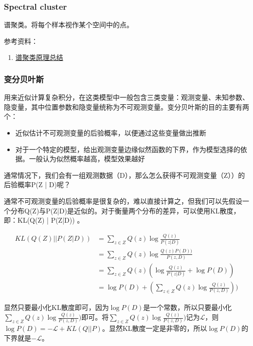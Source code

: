 \subsubsection{Spectral cluster}
谱聚类。将每个样本视作某个空间中的点。

参考资料：
\begin{enumerate}
	\item \href{https://www.cnblogs.com/pinard/p/6221564.htm}{谱聚类原理总结}
\end{enumerate}


\subsubsection{变分贝叶斯}
用来近似计算复杂积分，在这类模型中一般包含三类变量：观测变量、未知参数、隐变量，其中位置参数和隐变量统称为不可观测变量。变分贝叶斯的目的主要有两个：
\begin{itemize}
	\item 近似估计不可观测变量的后验概率，以便通过这些变量做出推断
	\item 对于一个特定的模型，给出观测变量边缘似然函数的下界，作为模型选择的依据。一般认为似然概率越高，模型效果越好
\end{itemize}
通常情况下，我们会有一组观测数据（D），那么怎么获得不可观测变量（Z））的后验概率P(Z | D)呢？

通常不可观测变量的后验概率是很复杂的，难以直接计算之，但我们可以先假设一个分布Q(Z)与P(Z|D)是近似的。对于衡量两个分布的差异，可以使用KL散度，即：KL(Q(Z) | P(Z|D)) 。

$$
\begin{equation}\nonumber
	\begin{aligned}
		KL(Q(Z) || P(Z|D)) &= \sum_{z \in Z} Q(z) \log \frac{Q(z)}{P(z|D)} \\
		&= \sum_{z \in Z} Q(z) \log \frac{Q(z) P(D) )}{P(z, D) } \\	
		&= \sum_{z \in Z} Q(z) ( \log \frac{Q(z)}{P(z|D)} + \log P(D) ) \\
		&= \log P(D) + ( \sum_{z \in Z} Q(z) \log \frac{Q(z)}{P(z, D)}) ) 
	\end{aligned}
\end{equation}
$$

显然只要最小化KL散度即可，因为$\log P(D)$是一个常数，所以只要最小化$\sum_{z \in Z} Q(z) \log \frac{Q(z)}{P(z, D)})$即可。将$\sum_{z \in Z} Q(z) \log \frac{Q(z)}{P(z, D)})$记为$\mathcal{L}$，则$\log P(D) = -\mathcal{L} + KL(Q || P)$。显然KL散度一定是非零的，所以$\log P(D)$的下界就是$-\mathcal{L}$。


